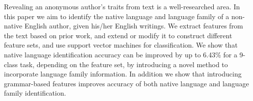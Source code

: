 Revealing an anonymous author's traits from text is a well-researched area. In this paper we aim to identify the native language and language family of a
 non-native English author, given his/her English writings. We extract features
 from the text based on prior work, and extend or modify it to construct
 different feature sets, and use support vector machines for classification. We
 show that native language identification accuracy can be improved by up to
 6.43\% for a 9-class task, depending on the feature set, by introducing a novel
 method to incorporate language family information. In addition we show that
 introducing grammar-based features improves accuracy of both native language
 and language family identification.

